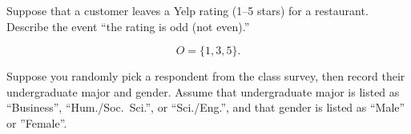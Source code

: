 \documentclass[11pt]{exam}
\begin{document}
\begin{questions}
\question \label{ques:odd-yelp} Suppose that a customer leaves a Yelp
rating (1--5 stars) for a restaurant.  Describe the event ``the rating is odd
(not even).''

\begin{solution}
\[
  O = \{ 1, 3, 5 \}.
\]
\end{solution}


\question \label{ques:survey-male}

Suppose you randomly pick a respondent from the class survey, then record
their undergraduate major and gender.  Assume that undergraduate major is
listed as ``Business'', ``Hum./Soc.~Sci.'', or ``Sci./Eng.'', and that gender
is listed as ``Male'' or ''Female''.



\newpage






\end{questions}
\end{document}
